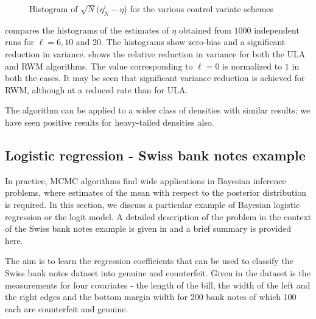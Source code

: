 \begin{figure}[h]
	\begin{center}
		\caption{Histogram of $\sqrt{N}(\eta_N^{i} - \eta$) for the various control variate schemes}
		\label{hist_mh_all}
	\end{center}
\end{figure}
 compares the histograms of the estimates of $\eta$ obtained from $1000$ independent runs for $\ell = 6, 10$ and $20$. The histograms show zero-bias and a significant reduction in variance.  shows the relative reduction in variance for both the ULA and RWM algorithms. The value corresponding to $\ell = 0$ is normalized to $1$ in both the cases. It may be seen that significant variance reduction is achieved for RWM, although at a reduced rate than for ULA.

The algorithm can be applied to a wider class of densities with similar results; we have seen positive results for heavy-tailed densities also. %

\subsection*{Logistic regression - Swiss bank notes example}
In practice, MCMC algorithms find wide applications in Bayesian inference problems, where estimates of the mean with respect to the posterior distribution is required. In this section, we discuss a particular example of Bayesian logistic regression or the logit model. A detailed description of the problem in the context of the Swiss bank notes example is given in \cite{papmirgir} and a brief summary is provided here.

The aim is to learn the regression coefficients that can be used to classify the Swiss bank notes dataset into genuine and counterfeit. Given in the dataset is the measurements for four covariates - the length of the bill, the width of the left and the right edges and the bottom margin width for 200 bank notes of which 100 each are counterfeit and genuine.

